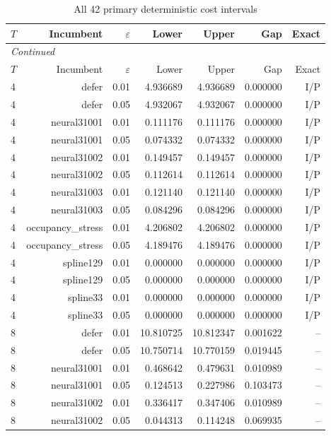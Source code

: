 {\small\setlength{\tabcolsep}{4pt}\begin{longtable}{lrrrrrr}
\caption{All 42 primary deterministic cost intervals}\label{tab:all_primary}\\
\toprule
$T$ & Incumbent & $\varepsilon$ & Lower & Upper & Gap & Exact \\
\midrule\endfirsthead
\multicolumn{7}{l}{\emph{Continued}}\\\toprule
$T$ & Incumbent & $\varepsilon$ & Lower & Upper & Gap & Exact \\
\midrule\endhead
4 & defer & 0.01 & 4.936689 & 4.936689 & 0.000000 & I/P \\
4 & defer & 0.05 & 4.932067 & 4.932067 & 0.000000 & I/P \\
4 & neural31001 & 0.01 & 0.111176 & 0.111176 & 0.000000 & I/P \\
4 & neural31001 & 0.05 & 0.074332 & 0.074332 & 0.000000 & I/P \\
4 & neural31002 & 0.01 & 0.149457 & 0.149457 & 0.000000 & I/P \\
4 & neural31002 & 0.05 & 0.112614 & 0.112614 & 0.000000 & I/P \\
4 & neural31003 & 0.01 & 0.121140 & 0.121140 & 0.000000 & I/P \\
4 & neural31003 & 0.05 & 0.084296 & 0.084296 & 0.000000 & I/P \\
4 & occupancy\_stress & 0.01 & 4.206802 & 4.206802 & 0.000000 & I/P \\
4 & occupancy\_stress & 0.05 & 4.189476 & 4.189476 & 0.000000 & I/P \\
4 & spline129 & 0.01 & 0.000000 & 0.000000 & 0.000000 & I/P \\
4 & spline129 & 0.05 & 0.000000 & 0.000000 & 0.000000 & I/P \\
4 & spline33 & 0.01 & 0.000000 & 0.000000 & 0.000000 & I/P \\
4 & spline33 & 0.05 & 0.000000 & 0.000000 & 0.000000 & I/P \\
8 & defer & 0.01 & 10.810725 & 10.812347 & 0.001622 & -- \\
8 & defer & 0.05 & 10.750714 & 10.770159 & 0.019445 & -- \\
8 & neural31001 & 0.01 & 0.468642 & 0.479631 & 0.010989 & -- \\
8 & neural31001 & 0.05 & 0.124513 & 0.227986 & 0.103473 & -- \\
8 & neural31002 & 0.01 & 0.336417 & 0.347406 & 0.010989 & -- \\
8 & neural31002 & 0.05 & 0.044313 & 0.114248 & 0.069935 & -- \\

\end{longtable}}

